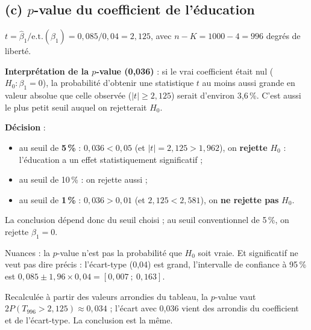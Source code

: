 \documentclass[11pt,a4paper]{article}
\begin{document}
\subsection*{(c) $p$-value du coefficient de l'éducation}

$t=\hat\beta_1/\text{e.t.}(\hat\beta_1)=0{,}085/0{,}04=2{,}125$, avec $n-K=1000-4=996$ degrés de liberté.

\begin{reponse}
\textbf{Interprétation de la $p$-value (0,036)} : si le vrai coefficient était nul ($H_0:\beta_1=0$), la probabilité d'obtenir une statistique $t$ au moins aussi grande en valeur absolue que celle observée ($|t|\ge2{,}125$) serait d'environ 3,6\,\%. C'est aussi le plus petit seuil auquel on rejetterait $H_0$.

\textbf{Décision} :
\begin{itemize}[nosep]
\item au seuil de \textbf{5\,\%} : $0{,}036<0{,}05$ (et $|t|=2{,}125>1{,}962$), on \textbf{rejette} $H_0$ : l'éducation a un effet statistiquement significatif ;
\item au seuil de 10\,\% : on rejette aussi ;
\item au seuil de \textbf{1\,\%} : $0{,}036>0{,}01$ (et $2{,}125<2{,}581$), on \textbf{ne rejette pas} $H_0$.
\end{itemize}
La conclusion dépend donc du seuil choisi ; au seuil conventionnel de 5\,\%, on rejette $\beta_1=0$.

Nuances : la $p$-value n'est pas la probabilité que $H_0$ soit vraie. Et significatif ne veut pas dire précis : l'écart-type (0,04) est grand, l'intervalle de confiance à 95\,\% est $0{,}085\pm1{,}96\times0{,}04=[0{,}007\ ;\ 0{,}163]$.
\end{reponse}

\begin{attention}
Recalculée à partir des valeurs arrondies du tableau, la $p$-value vaut $2P(T_{996}>2{,}125)\approx0{,}034$ ; l'écart avec 0,036 vient des arrondis du coefficient et de l'écart-type. La conclusion est la même.
\end{attention}
\end{document}
